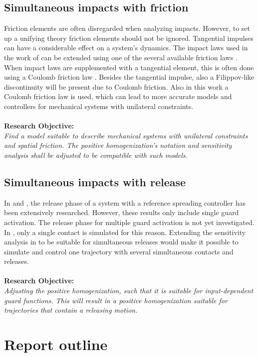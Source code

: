 \documentclass[../DC2017114Bouma.tex]{subfiles}
\begin{document}
\subsection*{Simultaneous impacts with friction}
Friction elements are often disregarded when analyzing impacts. However, to set up a unifying theory friction elements should not be ignored. Tangential impulses can have a considerable effect on a system's dynamics. The impact laws used in the work of \cite{Chen2018a} can be extended using one of the several available friction laws \cite{Leine2008}. When impact laws are supplemented with a tangential element, this is often done using a Coulomb friction law \cite{Glocker2014a}. Besides the tangential impulse, also a Filippov-like discontinuity will be present due to Coulomb friction. Also in this work a Coulomb friction law is used, which can lead to more accurate models and controllers for mechanical systems with unilateral constraints.\\\\
\textbf{Research Objective:}\\
\textit{Find a model suitable to describe mechanical systems with unilateral constraints and spatial friction. The positive homogenization's notation and sensitivity analysis shall be adjusted to be compatible with such models.}

\subsection*{Simultaneous impacts with release}
In \cite{Rijnen2016} and \cite{Rijn2016}, the release phase of a system with a reference spreading controller has been extensively researched. However, these results only include single guard activation. The release phase for multiple guard activation is not yet investigated. In \cite{Chen2018a}, only a single contact is simulated for this reason. Extending the sensitivity analysis in \cite{Chen2018a} to be suitable for simultaneous releases would make it possible to simulate and control one trajectory with several simultaneous contacts and releases.\\\\
\textbf{Research Objective:}\\
\textit{Adjusting the positive homogenization, such that it is suitable for input-dependent guard functions. This will result in a positive homogenization suitable for trajectories that contain a releasing motion.}
\section{Report outline}
\end{document}
